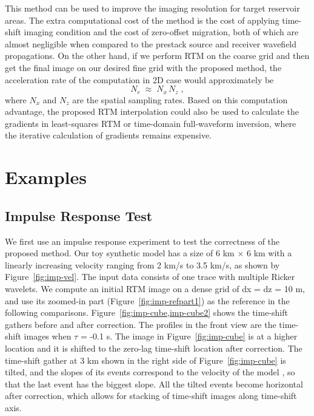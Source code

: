 This method can be used to improve the imaging resolution for target reservoir areas.
The extra computational cost of the method is the cost of applying time-shift imaging condition and the cost of zero-offset migration,
both of which are almost negligible when compared to the prestack source and receiver wavefield propagations.
On the other hand, if we perform RTM on the coarse grid and then get the final image on our desired fine grid with the proposed method,
the acceleration rate of the computation in 2D case would approximately be
\begin{equation}
	\label{eq:efficiency}
	N_e \; \approx \; N_x \, N_z \; ,
\end{equation}
where $N_x$ and $N_z$ are the spatial sampling rates.
Based on this computation advantage, the proposed RTM interpolation could also be used to calculate 
the gradients in least-squares RTM or time-domain full-waveform inversion, 
where the iterative calculation of gradients remains expensive.

\section{Examples}
\subsection{Impulse Response Test}

We first use an impulse response experiment to test the correctness of the proposed method.
Our toy synthetic model has a size of 6 km $\times$ 6 km with a linearly increasing velocity ranging from 2 km/s to 3.5 km/s, as shown by Figure~\ref{fig:imp-vel}.
The input data consists of one trace with multiple Ricker wavelets.
We compute an initial RTM image on a dense grid of dx = dz = 10 m,
and use its zoomed-in part (Figure~\ref{fig:imp-refpart1}) as the reference in the following comparisons.
Figure~\ref{fig:imp-cube,imp-cube2} shows the time-shift gathers before and after correction.
The profiles in the front view are the time-shift images when $\tau$ = -0.1 s.
The image in Figure~\ref{fig:imp-cube} is at a higher location 
and it is shifted to the zero-lag time-shift location after correction.
The time-shift gather at 3 km shown in the right side of Figure~\ref{fig:imp-cube} is tilted, and the slopes of
its events correspond to the velocity of the model \cite[]{sava06,xu14}, so that the last event has the biggest slope.
All the tilted events become horizontal after correction, which allows for stacking of time-shift images along time-shift axis.

